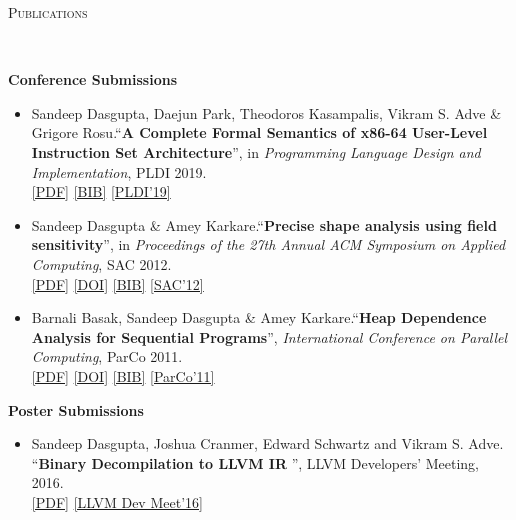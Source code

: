 \documentclass[9pt]{article}
\newenvironment{changemargin}[2]{%
  \begin{list}{}{%
    \setlength{\topsep}{0pt}%
    \setlength{\leftmargin}{#1}%
    \setlength{\rightmargin}{#2}%
    \setlength{\listparindent}{\parindent}%
    \setlength{\itemindent}{\parindent}%
    \setlength{\parsep}{\parskip}%
  }%
  \item[]}{\end{list}
}
\newcommand{\lineover}{
	\begin{changemargin}{-0.05in}{-0.05in}
		\vspace*{-8pt}
		\hrulefill \\
		\vspace*{-2pt}
	\end{changemargin}
}
\newcommand{\header}[1]{
	\begin{changemargin}{-0.5in}{-0.5in}
		\scshape{#1}\\
  	\lineover
	\end{changemargin}
}
\newenvironment{body} {
	\vspace*{-16pt}
	\begin{changemargin}{-0.25in}{-0.5in}
  }	
	{\end{changemargin}
}
\begin{document}
\smallskip

\header{Publications}
\begin{body}
\vspace{14pt}
\textbf{Conference Submissions}\\
	\vspace*{-4pt}
	\begin{itemize} \itemsep -0pt
		\item Sandeep Dasgupta, Daejun Park, Theodoros Kasampalis, Vikram S. Adve  \& Grigore Rosu.``\textbf{A Complete Formal Semantics of x86-64 User-Level
Instruction Set Architecture}'', in \emph{Programming Language Design and Implementation}, PLDI 2019. \\
                \href{http://webhost.engr.illinois.edu/~sdasgup3/Document/pldi_2019.pdf}{[PDF]}
                \href{http://webhost.engr.illinois.edu/~sdasgup3/Document/pldi_2019.bib}{[BIB]}
                \href{https://conf.researchr.org/home/pldi-2019}{[PLDI'19]}

		\item Sandeep Dasgupta \& Amey Karkare.``\textbf{Precise shape analysis using field sensitivity}'', in \emph{Proceedings of the 27th Annual ACM Symposium on Applied Computing}, SAC 2012. \\
                \href{http://webhost.engr.illinois.edu/~sdasgup3/Document/sac_2012.pdf}{[PDF]}
                \href{http://dx.doi.org/10.1145/2245276.2231982}{[DOI]}
                \href{http://webhost.engr.illinois.edu/~sdasgup3/Document/sac_2012.bib}{[BIB]}
                \href{https://www.sigapp.org/sac/sac2012/}{[SAC'12]}

		\item Barnali Basak, Sandeep Dasgupta \& Amey Karkare.``\textbf{Heap Dependence Analysis for Sequential Programs}'', \emph{International Conference on Parallel Computing}, ParCo 2011. \\ 
                \href{http://webhost.engr.illinois.edu/~sdasgup3/Document/parco_2011.pdf}{[PDF]}
                \href{http://dx.doi.org/10.3233/978-1-61499-041-3-99}{[DOI]}
                \href{http://webhost.engr.illinois.edu/~sdasgup3/Document/parco_2011.bib}{[BIB]}
                \href{http://parco2011.elis.ugent.be/}{[ParCo'11]}
	\end{itemize}

\textbf{Poster Submissions}\\
	\vspace*{-4pt}
	\begin{itemize} \itemsep -0pt
                \item Sandeep Dasgupta, Joshua Cranmer, Edward Schwartz and Vikram S. Adve. ``\textbf{Binary Decompilation to LLVM IR
                  }'', LLVM Developers' Meeting, 2016. \\
                  \href{http://webhost.engr.illinois.edu/~sdasgup3/Document/allin_poster.pdf}{[PDF]}
                  \href{https://llvm.org/devmtg/2016-11/}{[LLVM Dev Meet'16]}


\end{itemize}
\end{body}
\end{document}
